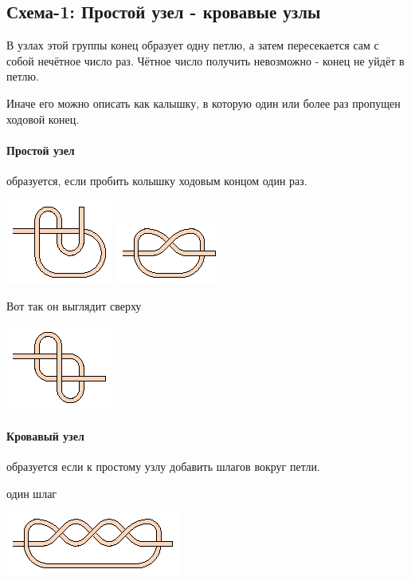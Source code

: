 \subsection{Схема-1: Простой узел - кровавые узлы}
В узлах этой группы конец образует одну петлю, а затем пересекается сам с собой нечётное число раз.
Чётное число получить невозможно - конец не уйдёт в петлю.

Иначе его можно описать как калышку, в которую один или более раз пропущен ходовой конец.

\graphicspath{{\currentpath}}

\paragraph{Простой узел} образуется, если пробить колышку ходовым концом один раз.

\includegraphics[scale=2]{images/double-simple-1-1.eps}
\includegraphics[scale=2]{images/simple.eps}

Вот так он выглядит сверху

\includegraphics[scale=2]{images/simple-v2.eps}

\paragraph{Кровавый узел} образуется если к простому узлу добавить шлагов вокруг петли.

один шлаг

\includegraphics[scale=2]{images/blood-1.eps}

